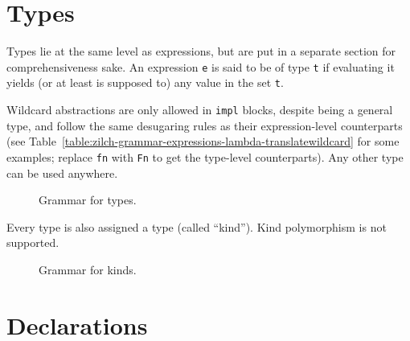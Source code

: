 \section{Types}\label{sec:zilch-grammar-types}

Types lie at the same level as expressions, but are put in a separate section for comprehensiveness sake.
An expression \verb|e| is said to be of type \verb|t| if evaluating it yields (or at least is supposed to) any value in the set \verb|t|.

Wildcard abstractions are only allowed in \verb|impl| blocks, despite being a general type, and follow the same desugaring rules as their expression-level counterparts (see Table~\ref{table:zilch-grammar-expressions-lambda-translatewildcard} for some examples; replace \verb|fn| with \verb|Fn| to get the type-level counterparts).
Any other type can be used anywhere.

\begin{figure}[H]
  \centering


  \caption{Grammar for types.}
  \label{fig:zilch-grammar-types-grammar}
\end{figure}

Every type is also assigned a type (called ``kind'').
Kind polymorphism is not supported.

\begin{figure}[H]
  \centering


  \caption{Grammar for kinds.}
  \label{fig:zilch-grammar-types-kindgrammar}
\end{figure}

\section{Declarations}\label{sec:zilch-grammar-declarations}

